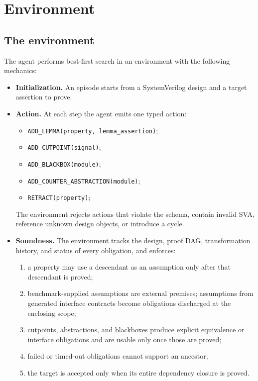 \section{Environment}
\label{sec:environment}

\subsection{The environment}

The agent performs best-first search in an environment with the following mechanics:

\begin{itemize}[nosep]
    \item \textbf{Initialization.} An episode starts from a SystemVerilog design and a target assertion to prove.

    \item \textbf{Action.} At each step the agent emits one typed action:
    \begin{itemize}[nosep]
        \item \texttt{ADD\_LEMMA(property, lemma\_assertion)};
        \item \texttt{ADD\_CUTPOINT(signal)};
        \item \texttt{ADD\_BLACKBOX(module)};
        \item \texttt{ADD\_COUNTER\_ABSTRACTION(module)};
        \item \texttt{RETRACT(property)};
    \end{itemize}
    The environment rejects actions that violate the schema, contain invalid SVA, reference unknown design objects, or introduce a cycle.

    \item \textbf{Soundness.} The environment tracks the design, proof DAG,
    transformation history, and status of every obligation, and enforces:
    \begin{enumerate}[nosep]
        \item a property may use a descendant as an assumption only after that
        descendant is proved;
        \item benchmark-supplied assumptions are external premises; assumptions
        from generated interface contracts become obligations discharged at the
        enclosing scope;
        \item cutpoints, abstractions, and blackboxes produce explicit equivalence
        or interface obligations and are usable only once those are proved;
        \item failed or timed-out obligations cannot support an ancestor;
        \item the target is accepted only when its entire dependency closure is
        proved.
    \end{enumerate}


\end{itemize}
